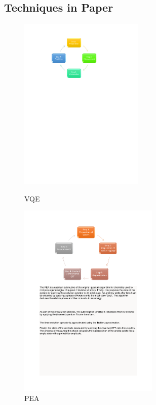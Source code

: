 \documentclass[landscape,color=UCLdarkred,margin=3cm]{uclposter}
\begin{document}
\begin{multicols}{3}
\section*{Techniques in Paper}



\begin{figure}[H]
  \begin{center}
  \begin{minipage}[c]{16em}
    
    \includegraphics[width=16em]{VQEdiagram.pdf}
    \caption{VQE}
  \end{minipage}
  \qquad
  \begin{minipage}[c]{18em}
    \centering
    \includegraphics[width=18em]{PEA.pdf}
    \caption{PEA}
  \end{minipage}
  \end{center}


\end{figure}
\end{multicols}
\end{document}
